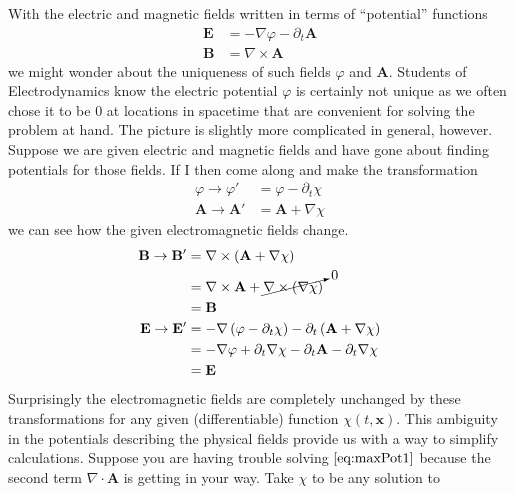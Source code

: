 With the electric and magnetic fields written in terms of ``potential'' functions
\begin{align}
    \mathbf{E} & = -\nabla\varphi - \partial_t\mathbf{A} \label{eq:Epotential} \\
    \mathbf{B} & = \nabla\times\mathbf{A} \label{eq:Bpotential}
\end{align}
we might wonder about the uniqueness of such fields \(\varphi\) and \(\mathbf{A}\).
Students of Electrodynamics know the electric potential \(\varphi\) is certainly
not unique as we often chose it to be 0 at locations in spacetime that are
convenient for solving the problem at hand. The picture is slightly more
complicated in general, however. Suppose we are given electric and magnetic
fields and have gone about finding potentials for those fields. If I then come
along and make the transformation
\begin{align}
    \varphi \to \varphi'     & = \varphi - \partial_t\chi \\
    \mathbf{A}\to\mathbf{A}' & = \mathbf{A} + \nabla\chi
\end{align}
we can see how the given electromagnetic fields change.
\begin{align*}
    \mathbf{B}\to\mathbf{B}' & = \nabla\times\left(\mathbf{A} + \nabla\chi\right)                                              \\
                             & = \nabla\times\mathbf{A} + \cancelto{0}{\nabla\times(\nabla\chi)}                               \\
                             & = \mathbf{B}                                                                                    \\
    \mathbf{E}\to\mathbf{E}' & = -\nabla\left(\varphi - \partial_t\chi\right) - \partial_t\left(\mathbf{A} + \nabla\chi\right) \\
                             & = -\nabla\varphi + \partial_t\nabla\chi - \partial_t\mathbf{A} - \partial_t\nabla\chi           \\
                             & = \mathbf{E}
\end{align*}
Surprisingly the electromagnetic fields are completely unchanged by these
transformations for any given (differentiable) function \(\chi(t,\mathbf{x})\).
This ambiguity in the potentials describing the physical fields provide us with
a way to simplify calculations. Suppose you are having trouble solving
\(\ref{eq:maxPot1}\) because the second term \(\nabla\cdot\mathbf{A}\) is
getting in your way. Take \(\chi\) to be any solution to
